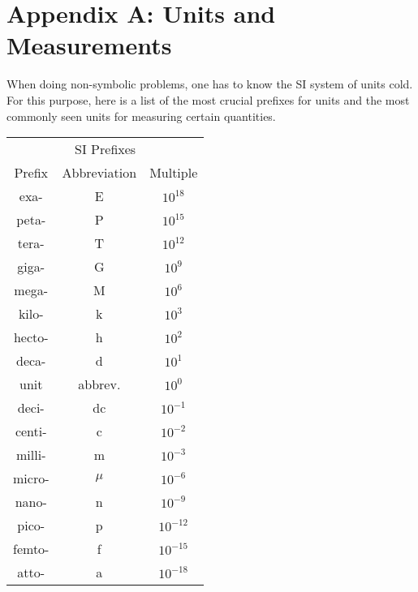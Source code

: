 \section*{Appendix A: Units and Measurements}
When doing non-symbolic problems, one has to know the SI system of units cold. For this purpose, here is a list of the most crucial prefixes for units and the most commonly seen units for measuring certain quantities.\vspace{3mm}
	\begin{tabular}{c c c} 
		\multicolumn{3}{c}{SI Prefixes} \\
		Prefix & Abbreviation & Multiple \\ \hline \hline \noalign{\smallskip}
		exa- & E & $10^{18}$ \\[3pt] \hline  \noalign{\smallskip}
		peta- & P & $10^{15}$ \\[3pt] \hline \noalign{\smallskip}
		tera- & T & $10^{12}$ \\[3pt] \hline \noalign{\smallskip}
		giga- & G & $10^9$ \\[3pt] \hline \noalign{\smallskip}
		mega- & M & $10^6$ \\[3pt] \hline \noalign{\smallskip}
		kilo- & k & $10^3$ \\[3pt] \hline \noalign{\smallskip}
		hecto- & h & $10^2$ \\[3pt] \hline \noalign{\smallskip}
		deca- & d & $10^1$ \\[3pt] \hline \noalign{\smallskip}
		 unit & abbrev. & $10^0$ \\[3pt] \hline \noalign{\smallskip}
		deci- & dc & $10^{-1}$ \\[3pt] \hline \noalign{\smallskip}
		centi- & c & $10^{-2}$ \\[3pt] \hline \noalign{\smallskip}
		milli- & m & $10^{-3}$ \\[3pt] \hline \noalign{\smallskip}
		micro- & $\mu$ & $10^{-6}$ \\[3pt] \hline \noalign{\smallskip}
		nano- & n & $10^{-9}$ \\[3pt] \hline \noalign{\smallskip}
		pico- & p & $10^{-12}$ \\[3pt] \hline \noalign{\smallskip}
		femto- & f & $10^{-15}$ \\[3pt] \hline \noalign{\smallskip}
		atto- & a & $10^{-18}$ \\[3pt] \hline \hline
	\end{tabular}
	\,
